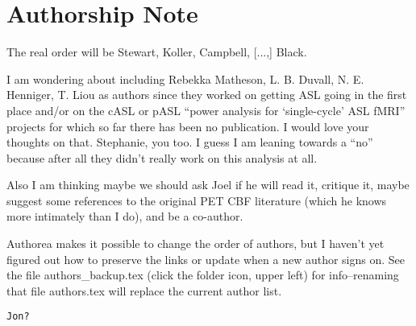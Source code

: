 \section*{Authorship Note}
The real order will be Stewart, Koller, Campbell, [...,] Black.

I am wondering about including Rebekka Matheson, L. B. Duvall, N. E. Henniger, T. Liou as authors since they worked on getting ASL going in the first place and/or on the cASL or pASL ``power analysis for `single-cycle' ASL fMRI'' projects for which so far there has been no publication. I would love your thoughts on that. Stephanie, you too. I guess I am leaning towards a ``no'' because after all they didn't really work on this analysis at all.

Also I am thinking maybe we should ask Joel if he will read it, critique it, maybe suggest some references to the original PET CBF literature (which he knows more intimately than I do), and be a co-author. 

Authorea makes it possible to change the order of authors, but I haven't yet figured out how to preserve the links or update when a new author signs on. See the file authors\_backup.tex (click the folder icon, upper left) for info--renaming that file authors.tex will replace the current author list.

\verb|Jon?|

